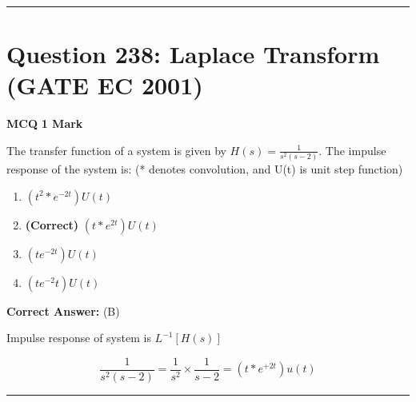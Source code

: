 \documentclass[11pt,a4paper]{article}
\begin{document}
\vspace{1.5em}
\hrule
\vspace{1.5em}

\section*{Question 238: Laplace Transform (GATE EC 2001)}
\noindent \textbf{\color{primary}MCQ} \hfill \textbf{\color{secondary}1 Mark}


\noindent The transfer function of a system is given by $H(s)=\frac{1}{s^2(s-2)}$. The impulse
response of the system is: (* denotes convolution, and U(t) is unit step function)


\begin{enumerate}[label=(\Alph*)]
    \item $(t^2 * e^{-2t})U(t)$
    \item \textbf{(Correct)} $(t * e^{2t})U(t)$
    \item $(te^{-2t})U(t)$
    \item $(te^{-2}t)U(t)$
\end{enumerate}

\noindent \textbf{Correct Answer:} (B)

\begin{tcolorbox}[solbox, title=Detailed Solution -- Question 238]
Impulse response of system is $L^{-1}[H(s)]$

\[
\frac{1}{s^{2}(s-2)}=\frac{1}{s^{2}} \times \frac{1}{s-2}=\left(t * e^{+2 t}\right) u(t)
\]
\end{tcolorbox}

\vspace{1.5em}
\hrule
\vspace{1.5em}
\end{document}

